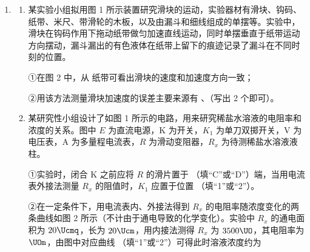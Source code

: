 \documentclass[\gkver]{gaokaozhenti}
\begin{document}
\begin{enumerate}


{①和④}
{②和③}
{②和④}


\item
\begin{enumerate}
	\item
	某实验小组拟用图 1 所示装置研究滑块的运动，实验器材有滑块、钩码、纸带、米尺、带滑轮的木板，以及由漏斗和细线组成的单摆等。实验中，滑块在钩码作用下拖动纸带做匀加速直线运动，同时单摆垂直于纸带运动方向摆动，漏斗漏出的有色液体在纸带上留下的痕迹记录了漏斗在不同时刻的位置。
	
	①在图 2 中，从  纸带可看出滑块的速度和加速度方向一致；
	
	②用该方法测量滑块加速度的误差主要来源有 、（写出 2 个即可）。
	
	
	\item
	某研究性小组设计了如图 1 所示的电路，用来研究稀盐水溶液的电阻率和浓度的关系。图中 $E$ 为直流电源，K 为开关，$K_{1}$ 为单刀双掷开关，V 为电压表，A 为多量程电流表，$R$ 为滑动变阻器，$R_{x}$ 为待测稀盐水溶液液柱。
	
	①实验时，闭合 K 之前应将 $R$ 的滑片置于 （填“C”或“D”）端，当用电流表外接法测量 $R_{x}$ 的阻值时，$K_{1}$ 应置于位置 （填“1”或“2”）。
	
	②在一定条件下，用电流表内、外接法得到 $R_{x}$ 的电阻率随浓度变化的两条曲线如图 2 所示（不计由于通电导致的化学变化）。实验中 $R_{x}$ 的通电面积为 $20\Ucmq$，长为 $20\Ucm$，用内接法测得 $R_{x}$ 为 $3500\UO$，其电阻率为  $\UOm$，由图中对应曲线 （填“1”或“2”）可得此时溶液浓度约为 %
	

\end{enumerate}
\end{enumerate}
\end{document}
